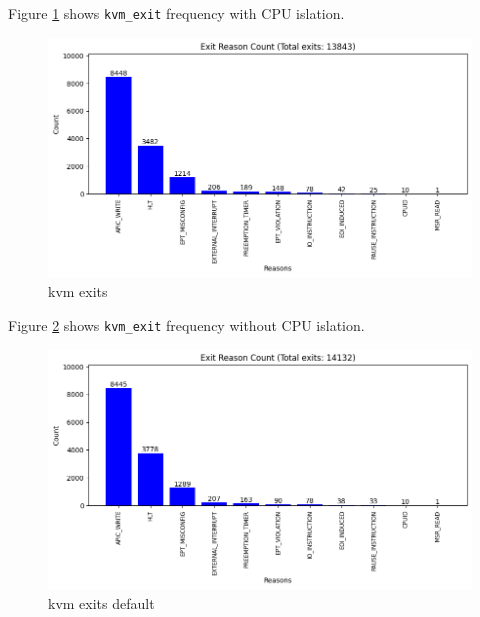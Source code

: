 \documentclass[MMR,Master,english]{twbook}
\begin{document}
\clearpage
Figure \ref{fig:kvm_exit_taskset} shows \texttt{kvm\_exit} frequency with CPU islation.
\begin{figure}[H]
	\centering
	\includegraphics[width=1.0\columnwidth]{img/kvm_exits_taskset.png}
	\caption[kvm exits]{kvm exits}
	\label{fig:kvm_exit_taskset}
\end{figure}

Figure \ref{fig:kvm_exits_default} shows \texttt{kvm\_exit} frequency without CPU islation.
\begin{figure}[H]
	\centering
	\includegraphics[width=1.0\columnwidth]{img/kvm_exits_default.png}
	\caption[kvm exits default]{kvm exits default}
	\label{fig:kvm_exits_default}
\end{figure}

\clearpage
\end{document}
